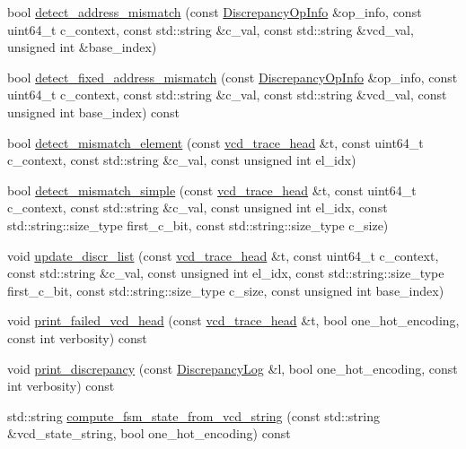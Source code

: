 \begin{DoxyCompactItemize}
bool \hyperlink{classvcd__utility_a97b5e66d24f1509be52266177627c391}{detect\+\_\+address\+\_\+mismatch} (const \hyperlink{classDiscrepancyOpInfo}{Discrepancy\+Op\+Info} \&op\+\_\+info, const uint64\+\_\+t c\+\_\+context, const std\+::string \&c\+\_\+val, const std\+::string \&vcd\+\_\+val, unsigned int \&base\+\_\+index)
\item 
bool \hyperlink{classvcd__utility_adcea7de16b7dbf1c8b74aef06fc959a5}{detect\+\_\+fixed\+\_\+address\+\_\+mismatch} (const \hyperlink{classDiscrepancyOpInfo}{Discrepancy\+Op\+Info} \&op\+\_\+info, const uint64\+\_\+t c\+\_\+context, const std\+::string \&c\+\_\+val, const std\+::string \&vcd\+\_\+val, const unsigned int base\+\_\+index) const
\item 
bool \hyperlink{classvcd__utility_a83e132ad97a12d201e14274c167bb2b6}{detect\+\_\+mismatch\+\_\+element} (const \hyperlink{structvcd__trace__head}{vcd\+\_\+trace\+\_\+head} \&t, const uint64\+\_\+t c\+\_\+context, const std\+::string \&c\+\_\+val, const unsigned int el\+\_\+idx)
\item 
bool \hyperlink{classvcd__utility_a96a0270243835db1afab5b8c82e3b320}{detect\+\_\+mismatch\+\_\+simple} (const \hyperlink{structvcd__trace__head}{vcd\+\_\+trace\+\_\+head} \&t, const uint64\+\_\+t c\+\_\+context, const std\+::string \&c\+\_\+val, const unsigned int el\+\_\+idx, const std\+::string\+::size\+\_\+type first\+\_\+c\+\_\+bit, const std\+::string\+::size\+\_\+type c\+\_\+size)
\item 
void \hyperlink{classvcd__utility_a5ca871239e451e2e15f8866dfcf2558d}{update\+\_\+discr\+\_\+list} (const \hyperlink{structvcd__trace__head}{vcd\+\_\+trace\+\_\+head} \&t, const uint64\+\_\+t c\+\_\+context, const std\+::string \&c\+\_\+val, const unsigned int el\+\_\+idx, const std\+::string\+::size\+\_\+type first\+\_\+c\+\_\+bit, const std\+::string\+::size\+\_\+type c\+\_\+size, const unsigned int base\+\_\+index)
\item 
void \hyperlink{classvcd__utility_a9ff21c0bde72b02cd81bd7443eba6353}{print\+\_\+failed\+\_\+vcd\+\_\+head} (const \hyperlink{structvcd__trace__head}{vcd\+\_\+trace\+\_\+head} \&t, bool one\+\_\+hot\+\_\+encoding, const int verbosity) const
\item 
void \hyperlink{classvcd__utility_a4f2a5d8b68fe639e2d1eeb4f4c4c429a}{print\+\_\+discrepancy} (const \hyperlink{structDiscrepancyLog}{Discrepancy\+Log} \&l, bool one\+\_\+hot\+\_\+encoding, const int verbosity) const
\item 
std\+::string \hyperlink{classvcd__utility_a0871f81ef5071712b79ea90d3831579c}{compute\+\_\+fsm\+\_\+state\+\_\+from\+\_\+vcd\+\_\+string} (const std\+::string \&vcd\+\_\+state\+\_\+string, bool one\+\_\+hot\+\_\+encoding) const
\end{DoxyCompactItemize}
